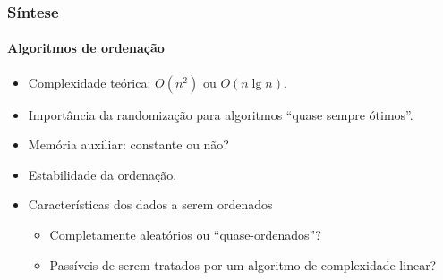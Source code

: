 \documentclass{beamer}
\begin{document}
\begin{frame}
  \frametitle{Síntese}
  \framesubtitle{Algoritmos de ordenação}

  \begin{itemize}
    \item Complexidade teórica: $O(n^2)$ ou $O(n \lg n)$.
    \item Importância da randomização para algoritmos ``quase sempre ótimos''.
    \item Memória auxiliar: constante ou não?
    \item Estabilidade da ordenação.
    \item Características dos dados a serem ordenados
      \begin{itemize}
        \item Completamente aleatórios ou ``quase-ordenados''?
        \item Passíveis de serem tratados por um algoritmo de complexidade linear?
      \end{itemize}
  \end{itemize}
\end{frame}
\end{document}
